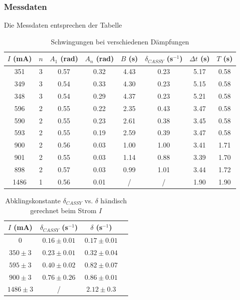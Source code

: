 \documentclass{article}
\begin{document}
\subsubsection{Messdaten}
Die Messdaten entsprechen der Tabelle

\begin{table}[H]
    \centering
    \begin{tabular}{|c|c|c|c|c|c|c|c|}
    \hline
    $I$ (mA) & $n$ & $A_1$ (rad) & $A_n$ (rad) & $B$ (s) & $\delta_{CASSY}$ (s$^{-1}$) & $\Delta t$ (s) & $T$ (s) \\
    \hline
    351 & 3 & 0.57 & 0.32 & 4.43 & 0.23 & 5.17 & 0.58 \\
    349 & 3 & 0.54 & 0.33 & 4.30 & 0.23 & 5.15 & 0.58 \\
    348 & 3 & 0.54 & 0.29 & 4.37 & 0.23 & 5.21 & 0.58 \\
    596 & 2 & 0.55 & 0.22 & 2.35 & 0.43 & 3.47 & 0.58 \\
    590 & 2 & 0.55 & 0.23 & 2.61 & 0.38 & 3.45 & 0.58 \\
    593 & 2 & 0.55 & 0.19 & 2.59 & 0.39 & 3.47 & 0.58 \\
    900 & 2 & 0.56 & 0.03 & 1.00 & 1.00 & 3.41 & 1.71 \\
    901 & 2 & 0.55 & 0.03 & 1.14 & 0.88 & 3.39 & 1.70 \\
    898 & 2 & 0.57 & 0.03 & 0.99 & 1.01 & 3.44 & 1.72 \\
    1486 & 1 & 0.56 & 0.01 & / & / & 1.90 & 1.90 \\
    \hline
    \end{tabular}
    \caption{Schwingungen bei verschiedenen Dämpfungen}
    \label{tab:schwingung_dämpfungen}
\end{table}

\begin{table}[H]
    \centering
    \begin{tabular}{|c|c|c|c|}
    \hline
    $I$ (mA) & $\delta_{CASSY}$ (s$^{-1}$) & $\delta$ (s$^{-1}$) \\
    \hline
    0 & $0.16 \pm 0.01$ & $0.17 \pm 0.01$ \\
    $350 \pm 3$ & $0.23 \pm 0.01$ & $0.32 \pm 0.04$ \\
    $595 \pm 3$ & $0.40 \pm 0.02$ & $0.82 \pm 0.07$ \\
    $900 \pm 3$ & $0.76 \pm 0.26$ & $0.86 \pm 0.01$ \\
    $1486 \pm 3$ & / & $2.12 \pm 0.3$ \\
    \hline
    \end{tabular}
    \caption{Abklingskonstante $\delta_{CASSY}$ vs. $\delta$ händisch gerechnet beim Strom $I$}
    \label{tab:dämpfungen_strom}
\end{table}
\end{document}
